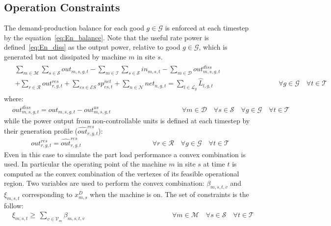 \documentclass{article}
\newcommand{\cT}{{\mathcal T}}
\newcommand{\cM}{{\mathcal M}}
\newcommand{\cI}{{\mathcal I}}
\newcommand{\cD}{{\mathcal D}}
\newcommand{\cS}{{\mathcal S}}
\newcommand{\cR}{{\mathcal R}}
\newcommand{\cES}{{\mathcal ES}}
\newcommand{\cN}{{\mathcal N}}
\newcommand{\cL}{{\mathcal L}}
\newcommand{\cV}{{\mathcal V}}
\newcommand{\cG}{{\mathcal G}}
\begin{document}
{\subsection{Operation Constraints}
The demand-production balance for each good $g \in \cG$ is enforced at each timestep by the equation~\eqref{eq:En_balance}. Note that the useful rate power is defined~\eqref{eq:En_diss} as the output power, relative to good $g \in \cG$, which is generated but not dissipated by machine $m$ in site $s$. 		
		\begin{align}
		\begin{split}
		& \sum_{m \in \cM} \sum_{s \in \cS} out_{m,s,g,t} - \sum_{m \in \cI} \sum_{s \in \cS} in_{m,s,t} - \sum_{m \in \cD} out_{m,s,g,t}^{diss} \\ 
		& + \sum_{r \in \cR} out_{r,g,t}^{res}  + \sum_{es \in \cES} sp_{es,t}^{net} + \sum_{n \in \cN} net_{n,g,t} = \sum_{l \in \cL_g} \hat{L}_{l,g,t}  \hspace{4cm} \forall g \in \cG \quad \forall t \in \cT \label{eq:En_balance}
		\end{split}		
		\end{align}
		where:
		\begin{align}
		& out_{m,s,g,t}^{diss} = out_{m,s,g,t}  - out_{m,s,g,t}^{us} & \hspace{4cm} \forall m \in \cD \quad \forall s \in \cS \quad \forall g \in \cG \quad \forall t \in \cT \label{eq:En_diss}
		\end{align}
		while the power output from non-controllable units is defined at each timestep by their generation profile ($\hat{out}_{r,g,t}^{res}$):
		\begin{align}
		& out_{r,g,t}^{res} = \hat{out}_{r,g,t}^{res}& \hspace{4cm} \forall r \in \cR \quad \forall g \in \cG \quad \forall t \in \cT \label{eq:En_res}
		\end{align}
Even in this case to simulate the part load performance a convex combination is used. In particular the operating point of the machine $m$ in  site $s$ at time $t$ is computed as the convex combination of the vertexes of its feasible operational region.  
Two variables are used to perform the convex combination: $\beta_{m,s,t,v}$ and $\xi_{m,s,t}$ corresponding to $x_{m,s}^D$ when the machine is on. The set of constraints is the follow: 		
		\begin{align}
		& \xi_{m,s,t} \ge\ \sum_{v \in \cV_m} \beta_{m,s,t,v} & \hspace{5cm} \forall m \in \cM \quad \forall s \in \cS \quad \forall t \in \cT \label{eq:Xi_beta_link}\\

\end{align}}
\end{document}
